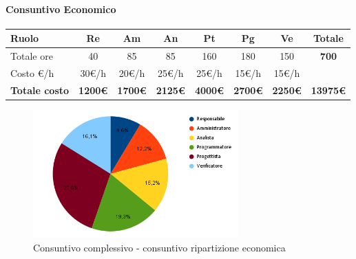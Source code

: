 \paragraph{Consuntivo Economico}
\begin{center}
	\renewcommand{\arraystretch}{1.8}
	\begin{tabular}{ |m{6em}|c|c|c|c|c|c|c| }
	\hline
	\textbf{Ruolo} & \textbf{Re} & \textbf{Am} &  \textbf{An} &  \textbf{Pt} &  \textbf{Pg} &  \textbf{Ve} &  \textbf{Totale}\\
    \hline
    Totale ore & 40 & 85 & 85 & 160 & 180 & 150 & \textbf{700}\\
    \hline
    Costo \euro/h & 30\euro/h & 20\euro/h & 25\euro/h & 25\euro/h & 15\euro/h & 15\euro/h & \\
    \hline
    \textbf{Totale costo} & \textbf{1200\euro} & \textbf{1700\euro} &  \textbf{2125\euro} & \textbf{4000\euro} &  \textbf{2700\euro} &  \textbf{2250\euro} &  \textbf{13975\euro} \\
    \hline
	\end{tabular}

    \begin{figure}[H]
        \centering\includegraphics[width=0.7\textwidth, height=0.7\textheight, keepaspectratio]{images/consuntivo/Complessivo-costo.png}
        \caption{Consuntivo complessivo - consuntivo ripartizione economica}
    \end{figure}
\end{center}

